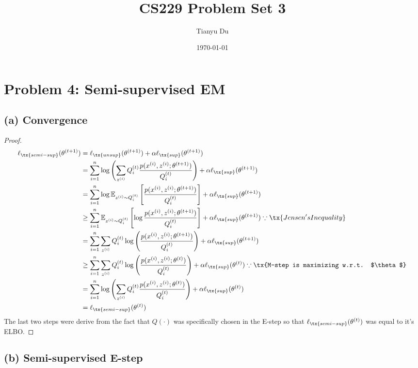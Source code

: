\documentclass[11pt]{article}
\title{CS229 Problem Set 3}
\date{\today}
\author{Tianyu Du}
\newcommand{\upi}[0]{^{(i)}}
\begin{document}
	\maketitle
	\section{Problem 4: Semi-supervised EM}
	\subsection{(a) Convergence}
	\begin{proof}
		\begin{align}
			\ell_{\tx{semi-sup}}(\theta^{(t+1)}) &= \ell_{\tx{unsup}}(\theta^{(t+1)}) + \alpha \ell_{\tx{sup}}(\theta^{(t+1)}) \\
			&= \sum_{i=1}^n \log \left(
			\sum_{z\upi} Q^{(t)}_i \frac{p(x\upi, z\upi; \theta^{(t+1)})}{Q^{(t)}_i}
			\right) + \alpha \ell_{\tx{sup}}(\theta^{(t+1)}) \\
			&= \sum_{i=1}^n \log \mathbb{E}_{z\upi \sim Q^{(t)}_i} \left[\frac{p(x\upi, z\upi; \theta^{(t+1)})}{Q^{(t)}_i}\right] + \alpha \ell_{\tx{sup}}(\theta^{(t+1)}) \\
			&\geq \sum_{i=1}^n \mathbb{E}_{z\upi \sim Q^{(t)}_i} \left[\log \frac{p(x\upi, z\upi; \theta^{(t+1)})}{Q^{(t)}_i}\right] + \alpha \ell_{\tx{sup}}(\theta^{(t+1)}) \because \tx{Jensen's Inequality} \\
			&= \sum_{i=1}^n \sum_{z\upi} Q^{(t)}_i \log \left( \frac{p(x\upi, z\upi; \theta^{(t+1)})}{Q^{(t)}_i}\right ) + \alpha \ell_{\tx{sup}}(\theta^{(t+1)}) \\
			&\geq \sum_{i=1}^n \sum_{z\upi} Q^{(t)}_i \log \left( \frac{p(x\upi, z\upi; \theta^{(t)})}{Q^{(t)}_i}\right ) + \alpha \ell_{\tx{sup}}(\theta^{(t)}) \because \tx{M-step is maximizing w.r.t. $\theta$} \\
			&= \sum_{i=1}^n \log \left( \sum_{z\upi} Q^{(t)}_i \frac{p(x\upi, z\upi; \theta^{(t)})}{Q^{(t)}_i}\right ) + \alpha \ell_{\tx{sup}}(\theta^{(t)}) \\
			&= \ell_{\tx{semi-sup}}(\theta^{(t)})
		\end{align}
		The last two steps were derive from the fact that $Q(\cdot)$ was specifically chosen in the E-step so that $\ell_{\tx{semi-sup}}(\theta^{(t)})$ was equal to it's ELBO.
	\end{proof}
	\newpage
	\subsection{(b) Semi-supervised E-step}
\end{document}

